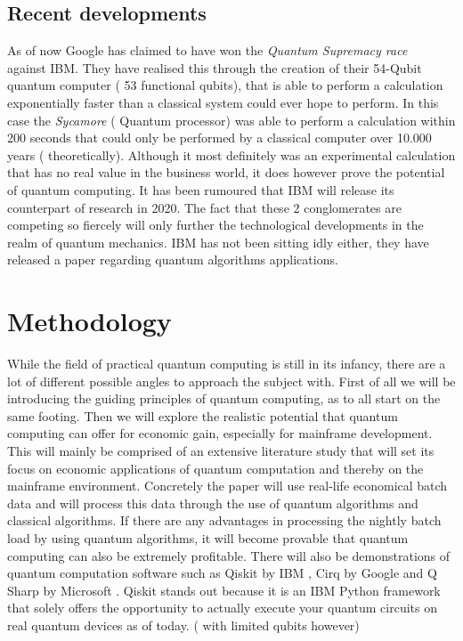\subsection{Recent developments}

As of now Google has claimed to have won the \emph{Quantum Supremacy race} ~\autocite{Google2019} against IBM. They have realised this through the creation of their 54-Qubit quantum computer ( 53 functional qubits), that is able to perform a calculation exponentially faster than a classical system could ever hope to perform. In this case the \emph{Sycamore} ( Quantum processor) was able to perform a calculation within 200 seconds that could only be performed by a classical computer over 10.000 years ( theoretically). Although it most definitely was an experimental calculation that has no real value in the business world, it does however prove the potential of quantum computing. It has been rumoured that IBM will release its counterpart of research in 2020. The fact that these 2 conglomerates are competing so fiercely will only further the technological developments in the realm of quantum mechanics. IBM has not been sitting idly either, they have released a paper regarding quantum algorithms applications. \autocite{IBM2019}



\section{Methodology}
\label{sec:Methodology}

While the field of practical quantum computing is still in its infancy, there are a lot of different possible angles to approach the subject with. First of all we will be introducing the guiding principles of quantum computing, as to all start on the same footing. Then we will explore the realistic potential that quantum computing can offer for economic gain, especially for mainframe development. This will mainly be comprised of an extensive literature study that will  set its focus on economic applications of quantum computation and thereby on the mainframe environment. Concretely the paper will use real-life economical batch data and will process this data through the use of quantum algorithms and classical algorithms. If there are any advantages in processing the nightly batch load by using quantum algorithms, it will become provable that quantum computing can also be extremely profitable.
There will also be demonstrations of quantum computation software such as Qiskit by IBM \autocite{Qiskit}, Cirq by Google \autocite{Cirq} and Q Sharp by Microsoft \autocite{QSharp}. Qiskit stands out because it is an IBM Python framework that solely offers the opportunity to actually execute your quantum circuits on real quantum devices as of today. ( with limited qubits however)

